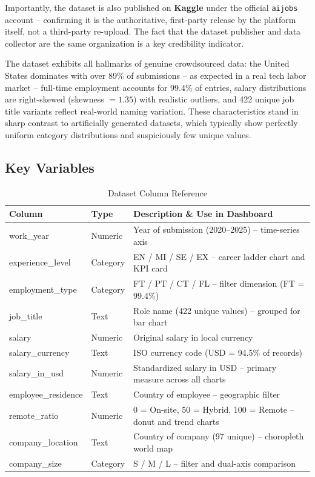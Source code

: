 \documentclass[12pt,a4paper]{article}
\begin{document}
Importantly, the dataset is also published on \textbf{Kaggle} under the official
\texttt{aijobs} account -- confirming it is the authoritative, first-party release
by the platform itself, not a third-party re-upload. The fact that the dataset
publisher and data collector are the same organization is a key credibility indicator.

The dataset exhibits all hallmarks of genuine crowdsourced data: the United States
dominates with over 89\% of submissions -- as expected in a real tech labor market --
full-time employment accounts for 99.4\% of entries, salary distributions are
right-skewed (skewness $= 1.35$) with realistic outliers, and 422 unique job title
variants reflect real-world naming variation. These characteristics stand in sharp
contrast to artificially generated datasets, which typically show perfectly uniform
category distributions and suspiciously few unique values.

\subsection{Key Variables}

\begin{table}[H]
\centering
\caption{Dataset Column Reference}
\renewcommand{\arraystretch}{1.3}
\begin{tabularx}{\linewidth}{>{\ttfamily}l l W}
\toprule
\textbf{Column} & \textbf{Type} & \textbf{Description \& Use in Dashboard} \\
\midrule
work\_year          & Numeric  & Year of submission (2020--2025) -- time-series axis \\
experience\_level   & Category & EN / MI / SE / EX -- career ladder chart and KPI card \\
employment\_type    & Category & FT / PT / CT / FL -- filter dimension (FT = 99.4\%) \\
job\_title          & Text     & Role name (422 unique values) -- grouped for bar chart \\
salary              & Numeric  & Original salary in local currency \\
salary\_currency    & Text     & ISO currency code (USD = 94.5\% of records) \\
salary\_in\_usd     & Numeric  & Standardized salary in USD -- primary measure across all charts \\
employee\_residence & Text     & Country of employee -- geographic filter \\
remote\_ratio       & Numeric  & 0 = On-site, 50 = Hybrid, 100 = Remote -- donut and trend charts \\
company\_location   & Text     & Country of company (97 unique) -- choropleth world map \\
company\_size       & Category & S / M / L -- filter and dual-axis comparison \\
\bottomrule
\end{tabularx}
\end{table}
\end{document}
